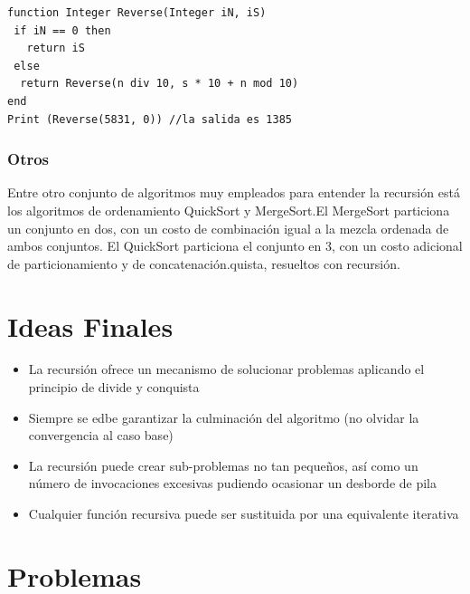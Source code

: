\begin{lstlisting}[upquote=true, language=pseudo]
function Integer Reverse(Integer iN, iS)
 if iN == 0 then
   return iS
 else
  return Reverse(n div 10, s * 10 + n mod 10)
end
Print (Reverse(5831, 0)) //la salida es 1385
\end{lstlisting}

\subsubsection{Otros}
Entre otro conjunto de algoritmos muy empleados para entender la recursión está los algoritmos de ordenamiento QuickSort y MergeSort.El MergeSort particiona un conjunto en dos, con un costo de combinación igual a la mezcla ordenada de ambos conjuntos. El QuickSort particiona el conjunto en 3, con un costo adicional de particionamiento y de concatenación.quista, resueltos con recursión.

\section{Ideas Finales}

\begin{itemize}
\item La recursión ofrece un mecanismo de solucionar problemas aplicando el principio de divide y conquista
\item Siempre se edbe garantizar la culminación del algoritmo (no olvidar la convergencia al caso base)
\item La recursión puede crear sub-problemas no tan pequeños, así como un número de invocaciones excesivas pudiendo ocasionar un desborde de pila
\item Cualquier función recursiva puede ser sustituida por una equivalente iterativa
\end{itemize}

\section{Problemas}

